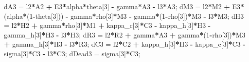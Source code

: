 \documentclass[
]{article}
\newenvironment{Shaded}{\begin{snugshade}}{\end{snugshade}}
\newcommand{\DecValTok}[1]{\textcolor[rgb]{0.00,0.00,0.81}{#1}}
\newcommand{\NormalTok}[1]{#1}
\newcommand{\OperatorTok}[1]{\textcolor[rgb]{0.81,0.36,0.00}{\textbf{#1}}}
\newcommand{\StringTok}[1]{\textcolor[rgb]{0.31,0.60,0.02}{#1}}
\begin{document}
\begin{Shaded}
\begin{Highlighting}[]
\NormalTok{    dA3 =}\StringTok{ }\NormalTok{l2}\OperatorTok{*}\NormalTok{A2 }\OperatorTok{+}\StringTok{ }\NormalTok{E3}\OperatorTok{*}\NormalTok{alpha}\OperatorTok{*}\NormalTok{theta[}\DecValTok{3}\NormalTok{] }\OperatorTok{-}\StringTok{ }\NormalTok{gamma}\OperatorTok{*}\NormalTok{A3 }\OperatorTok{-}\StringTok{ }\NormalTok{l3}\OperatorTok{*}\NormalTok{A3;}
\NormalTok{    dM3 =}\StringTok{ }\NormalTok{l2}\OperatorTok{*}\NormalTok{M2 }\OperatorTok{+}\StringTok{ }\NormalTok{E3}\OperatorTok{*}\NormalTok{(alpha}\OperatorTok{*}\NormalTok{(}\DecValTok{1}\OperatorTok{-}\NormalTok{theta[}\DecValTok{3}\NormalTok{])) }\OperatorTok{-}\StringTok{ }\NormalTok{gamma}\OperatorTok{*}\NormalTok{rho[}\DecValTok{3}\NormalTok{]}\OperatorTok{*}\NormalTok{M3 }\OperatorTok{-}\StringTok{ }\NormalTok{gamma}\OperatorTok{*}\NormalTok{(}\DecValTok{1}\OperatorTok{-}\NormalTok{rho[}\DecValTok{3}\NormalTok{])}\OperatorTok{*}\NormalTok{M3 }\OperatorTok{-}\StringTok{ }\NormalTok{l3}\OperatorTok{*}\NormalTok{M3;}
\NormalTok{    dH3 =}\StringTok{ }\NormalTok{l2}\OperatorTok{*}\NormalTok{H2 }\OperatorTok{+}\StringTok{ }\NormalTok{gamma}\OperatorTok{*}\NormalTok{rho[}\DecValTok{3}\NormalTok{]}\OperatorTok{*}\NormalTok{M1 }\OperatorTok{+}\StringTok{ }\NormalTok{kappa_c[}\DecValTok{3}\NormalTok{]}\OperatorTok{*}\NormalTok{C3 }\OperatorTok{-}\StringTok{ }\NormalTok{kappa_h[}\DecValTok{3}\NormalTok{]}\OperatorTok{*}\NormalTok{H3 }\OperatorTok{-}\StringTok{ }\NormalTok{gamma_h[}\DecValTok{3}\NormalTok{]}\OperatorTok{*}\NormalTok{H3 }\OperatorTok{-}\StringTok{ }\NormalTok{l3}\OperatorTok{*}\NormalTok{H3;}
\NormalTok{    dR3 =}\StringTok{ }\NormalTok{l2}\OperatorTok{*}\NormalTok{R2 }\OperatorTok{+}\StringTok{ }\NormalTok{gamma}\OperatorTok{*}\NormalTok{A3 }\OperatorTok{+}\StringTok{ }\NormalTok{gamma}\OperatorTok{*}\NormalTok{(}\DecValTok{1}\OperatorTok{-}\NormalTok{rho[}\DecValTok{3}\NormalTok{])}\OperatorTok{*}\NormalTok{M3 }\OperatorTok{+}\StringTok{ }\NormalTok{gamma_h[}\DecValTok{3}\NormalTok{]}\OperatorTok{*}\NormalTok{H3 }\OperatorTok{-}\StringTok{ }\NormalTok{l3}\OperatorTok{*}\NormalTok{R3;}
\NormalTok{    dC3 =}\StringTok{ }\NormalTok{l2}\OperatorTok{*}\NormalTok{C2 }\OperatorTok{+}\StringTok{ }\NormalTok{kappa_h[}\DecValTok{3}\NormalTok{]}\OperatorTok{*}\NormalTok{H3 }\OperatorTok{-}\StringTok{ }\NormalTok{kappa_c[}\DecValTok{3}\NormalTok{]}\OperatorTok{*}\NormalTok{C3 }\OperatorTok{-}\StringTok{ }\NormalTok{sigma[}\DecValTok{3}\NormalTok{]}\OperatorTok{*}\NormalTok{C3 }\OperatorTok{-}\StringTok{ }\NormalTok{l3}\OperatorTok{*}\NormalTok{C3;}
\NormalTok{    dDead3 =}\StringTok{ }\NormalTok{sigma[}\DecValTok{3}\NormalTok{]}\OperatorTok{*}\NormalTok{C3;}

\end{Highlighting}
\end{Shaded}
\end{document}
